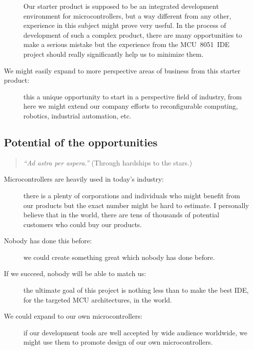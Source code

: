 \documentclass[a4paper,twoside,15pt]{book}
\begin{document}
\begin{description}
                    Our starter product is supposed to be an integrated development environment for microcontrollers, but a way different from any other, experience in this subject might prove very useful. In the process of development of such a complex product, there are many opportunities to make a serious mistake but the experience from the MCU~8051~IDE project should really significantly help us to minimize them.
                \item[We might easily expand to more perspective areas of business from this starter product:]
                    this a unique opportunity to start in a perspective field of industry, from here we might extend our company efforts to reconfigurable computing, robotics, industrial automation, etc.
            \end{description}

        \subsection{Potential of the opportunities}
            \begin{quote}
                \textit{``Ad astra per aspera.''} \small{(Through hardships to the stars.)}
            \end{quote}
             \begin{description}
                    \item[Microcontrollers are heavily used in today's industry:]
                        there is a plenty of corporations and individuals who might benefit from our products but the exact number might be hard to estimate. I personally believe that in the world, there are tens of thousands of potential customers who could buy our products.
                    \item[Nobody has done this before:]
                        we could create something great which nobody has done before.
                    \item[If we succeed, nobody will be able to match us:]
                        the ultimate goal of this project is nothing less than to make the best IDE, for the targeted MCU architectures, in the world.
                    \item[We could expand to our own microcontrollers:]
                        if our development tools are well accepted by wide audience worldwide, we might use them to promote design of our own microcontrollers.
            \end{description}
\end{document}
